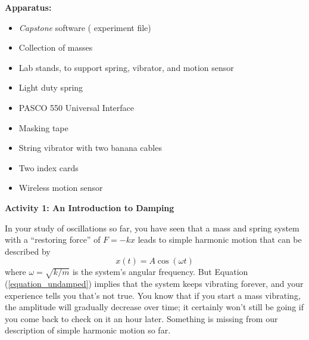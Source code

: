 \makelabheader %

\bigskip
\textbf{Apparatus:}
\begin{itemize}[nosep]
\item \textit{Capstone} software ( experiment file)
\item Collection of masses 
\item Lab stands, to support spring, vibrator, and motion sensor
\item Light duty spring
\item PASCO 550 Universal Interface
\item Masking tape
\item String vibrator with two banana cables
\item Two index cards
\item Wireless motion sensor


\end{itemize}


\bigskip
\textbf{Activity 1: An Introduction to Damping} 

In your study of oscillations so far, you have seen that a mass and spring system with a ``restoring force'' of $F=-kx$ leads to simple harmonic motion that can be described by
\begin{equation}
x(t)=A\cos (\omega t)
\label{equation_undamped}
\end{equation}
where $\omega = \sqrt{k/m}$ is the system's angular frequency.
But Equation (\ref{equation_undamped}) implies that the system keeps vibrating forever, and your experience tells you that's not true.  You know that if you start a mass vibrating, the amplitude will gradually decrease over time; it certainly won't still be going if you come back to check on it an hour later.  Something is missing from our description of simple harmonic motion so far.


